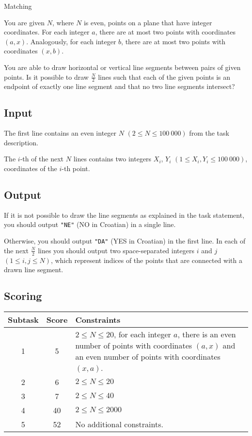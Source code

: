 \begin{statement}[
  problempoints=110,
  timelimit=2.5 seconds,
  memorylimit=512 MiB,
]{Matching}

You are given $N$, where $N$ is even, points on a plane that have integer
coordinates. For each integer $a$, there are at most two points with coordinates
$(a, x)$. Analogously, for each integer $b$, there are at most two points
with coordinates $(x, b)$.

You are able to draw horizontal or vertical line segments between pairs of given
points. Is it possible to draw $\frac{N}{2}$ lines such that each of the
given points is an endpoint of exactly one line segment and that no two line
segments intersect?

\subsection*{Input}
The first line contains an even integer $N$ $(2 \le N \le 100\ 000)$ from
the task description.

The $i$-th of the next $N$ lines contains two integers $X_i$, $Y_i$
$(1 \le X_i, Y_i \le 100\ 000)$, coordinates of the $i$-th point.

\subsection*{Output}
If it is not possible to draw the line segments as explained in the task
statement, you should output \texttt{"NE"} (NO in Croatian) in a single line.

Otherwise, you should output \texttt{"DA"} (YES in Croatian) in the first
line. In each of the next $\frac{N}{2}$ lines you should output two
space-separated integers $i$ and $j$ $(1 \le i, j \le N)$, which represent
indices of the points that are connected with a drawn line segment.

 \subsection*{Scoring}
{\renewcommand{\arraystretch}{1.4}
  \setlength{\tabcolsep}{6pt}
  \begin{tabular}{ccl}
 Subtask & Score & Constraints \\ \midrule
    1 & 5 &   \makecell[l]{$2 \le N \le 20$, for each integer $a$, there is an even
              number of points with coordinates $(a, x)$ \\ and an even number
              of points with coordinates
              $(x, a)$. } \\
  2 & 6 & $2 \le N \le 20$ \\
  3 & 7 & $2 \le N \le 40$ \\
  4 & 40 & $2 \le N \le 2000$ \\
  5 & 52 & No additional constraints.
\end{tabular}}


\end{statement}
